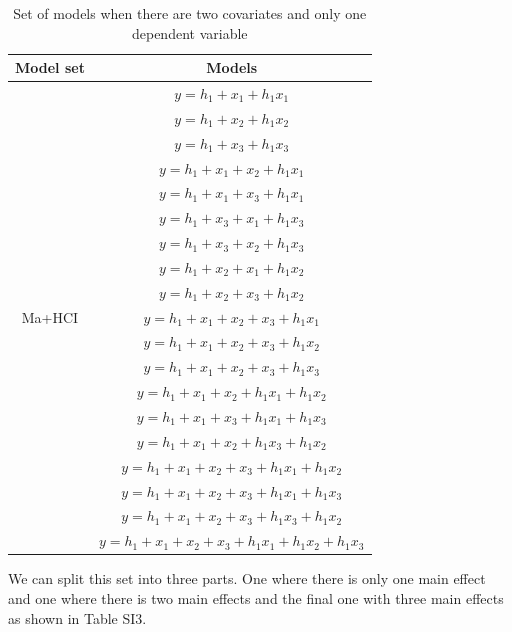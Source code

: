 \begin{table}[]
\caption{}
\caption*{\footnotesize Set of models when there are two covariates and only one dependent variable}
\centering
\begin{tabular}{cc}
\toprule
Model set & Models \\ 
\midrule
\multirow{19}{*}{Ma+HCI} & $y=h_1+x_1+h_1x_1$\\ &  $y=h_1+x_2+h_1x_2$\\ &  $y=h_1+x_3+h_1x_3$\\ & $y=h_1+x_1+x_2+h_1x_1$\\ & $y=h_1+x_1+x_3+h_1x_1$\\ & $y=h_1+x_3+x_1+h_1x_3$\\ & $y=h_1+x_3+x_2+h_1x_3$\\ & $y=h_1+x_2+x_1+h_1x_2$\\ & $y=h_1+x_2+x_3+h_1x_2$\\ & $y=h_1+x_1+x_2+x_3+h_1x_1$\\ & $y=h_1+x_1+x_2+x_3+h_1x_2$\\ & $y=h_1+x_1+x_2+x_3+h_1x_3$\\ & $y=h_1+x_1+x_2+h_1x_1+h_1x_2$\\ & $y=h_1+x_1+x_3+h_1x_1+h_1x_3$\\ & $y=h_1+x_1+x_2+h_1x_3+h_1x_2$\\ & $y=h_1+x_1+x_2+x_3+h_1x_1+h_1x_2$\\ & $y=h_1+x_1+x_2+x_3+h_1x_1+h_1x_3$\\ & $y=h_1+x_1+x_2+x_3+h_1x_3+h_1x_2$\\ & $y=h_1+x_1+x_2+x_3+h_1x_1+h_1x_2+h_1x_3$\\  
\bottomrule
\end{tabular}
\end{table}


We can split this set into three parts. One where there is only one main effect and one where there is two main effects and the final one with three main effects as shown in Table SI3.\\


